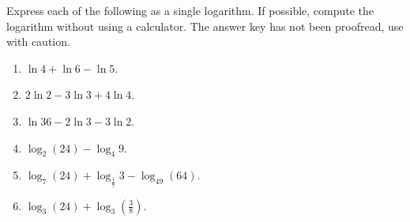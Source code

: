 Express each of the following as a single logarithm. If possible, compute the logarithm without using a calculator. The answer key has not been proofread, use with caution.

\begin{enumerate}[ref={\fcProblemRef}]
\item   $\ln 4 + \ln 6 - \ln 5$.

\item \label{problem2ln(2)-3ln(3)+4ln(4)} $2\ln 2 - 3\ln 3 + 4\ln 4$.

\item   $\ln 36 - 2\ln 3 - 3\ln 2$.


\item $\log_2(24)-\log_{4}9$.


\item $\log_7(24)+\log_{\frac{1}{7}}3-\log_{49} (64)$.

\item $\log_3(24)+\log_{3}\left(\frac{3}{8}\right)$.


\end{enumerate}
